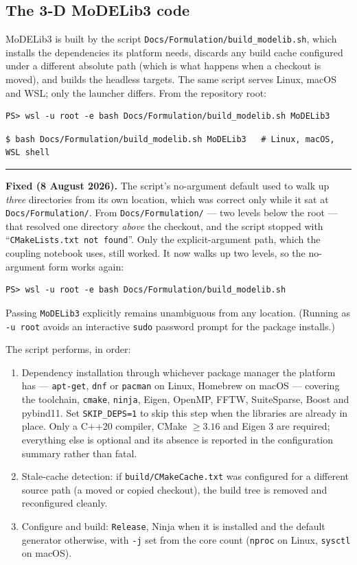 \documentclass[11pt]{article}
\newcommand{\MoD}{\textsf{MoDELib3}}
\newcommand{\code}[1]{\texttt{\small #1}}
\newcommand{\file}[1]{\texttt{\footnotesize #1}}
\newenvironment{notebox}
  {\par\medskip\noindent
   \begin{minipage}{\textwidth}
   {\color{blue!50!black}\rule{\textwidth}{0.8pt}}\par\smallskip
   \small\noindent{\color{blue!50!black}\textbf{Note.}}\space}
  {\par\smallskip\noindent{\color{blue!50!black}\rule{\textwidth}{0.8pt}}
   \end{minipage}\par\medskip}
\begin{document}
\subsection{The 3-D \MoD{} code}
\label{sec:buildmod}

\MoD{} is built by the script \file{Docs/Formulation/build\_modelib.sh},
which installs the dependencies its platform needs, discards any build cache
configured under a different absolute path (which is what happens when a
checkout is moved), and builds the headless targets. The same script serves
Linux, macOS and WSL; only the launcher differs. From the repository root:

\begin{lstlisting}[style=ps]
PS> wsl -u root -e bash Docs/Formulation/build_modelib.sh MoDELib3
\end{lstlisting}
\begin{lstlisting}[style=wsl]
$ bash Docs/Formulation/build_modelib.sh MoDELib3   # Linux, macOS, WSL shell
\end{lstlisting}

\begin{notebox}
\textbf{Fixed (8 August 2026).} The script's no-argument default used to walk
up \emph{three} directories from its own location, which was correct only
while it sat at \file{Docs/Formulation/}. From
\file{Docs/Formulation/} --- two levels below the root --- that resolved one
directory \emph{above} the checkout, and the script stopped with
``\code{CMakeLists.txt not found}''. Only the explicit-argument path, which
the coupling notebook uses, still worked. It now walks up two levels, so the
no-argument form works again:
\begin{lstlisting}[style=ps]
PS> wsl -u root -e bash Docs/Formulation/build_modelib.sh
\end{lstlisting}
Passing \file{MoDELib3} explicitly remains unambiguous from any location.
(Running as \code{-u root} avoids an interactive \code{sudo} password prompt
for the package installs.)
\end{notebox}

The script performs, in order:
\begin{enumerate}
\item Dependency installation through whichever package manager the platform
has --- \code{apt-get}, \code{dnf} or \code{pacman} on Linux, Homebrew on
macOS --- covering the toolchain, \code{cmake}, \code{ninja}, Eigen, OpenMP,
FFTW, SuiteSparse, Boost and pybind11. Set \code{SKIP\_DEPS=1} to skip this
step when the libraries are already in place. Only a C++20 compiler, CMake
$\ge 3.16$ and Eigen 3 are required; everything else is optional and its
absence is reported in the configuration summary rather than fatal.
\item Stale-cache detection: if \file{build/CMakeCache.txt} was configured
for a different source path (a moved or copied checkout), the build tree is
removed and reconfigured cleanly.
\item Configure and build: \code{Release}, Ninja when it is installed and the
default generator otherwise, with \code{-j} set from the core count
(\code{nproc} on Linux, \code{sysctl} on macOS).
\end{enumerate}
\end{document}
